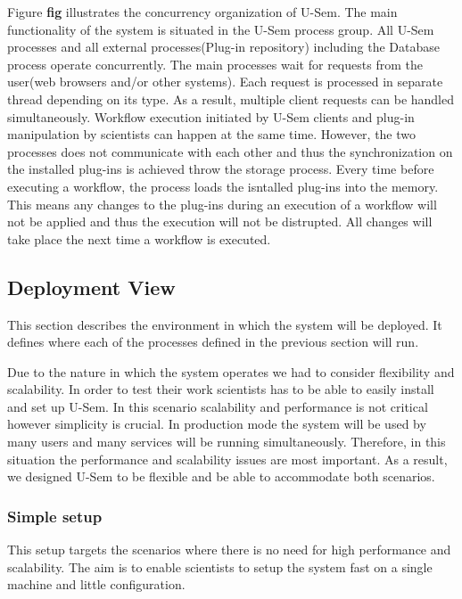 Figure \textbf{fig} illustrates the concurrency organization of U-Sem. The main functionality of the system is situated in the U-Sem process group. All U-Sem processes and all external processes(Plug-in repository) including the Database process operate concurrently. The main processes wait for requests from the user(web browsers and/or other systems). Each request is processed in separate thread depending on its type. As a result, multiple client requests can be handled simultaneously. Workflow execution initiated by U-Sem clients and plug-in manipulation by scientists can happen at the same time. However, the two processes does not communicate with each other and thus the synchronization on the installed plug-ins is achieved throw the storage process. Every time before executing a workflow, the process loads the isntalled plug-ins into the memory. This means any changes to the plug-ins during an execution of a workflow will not be applied and thus the execution will not be distrupted. All changes will take place the next time a workflow is executed.

\subsection{Deployment View}

This section describes the environment in which the system will be deployed. It defines where each of the processes defined in the previous section will run. 

Due to the nature in which the system operates we had to consider flexibility and scalability. In order to test their work scientists has to be able to easily install and set up U-Sem. In this scenario scalability and performance is not critical however simplicity is crucial. In production mode the system will be used by many users and many services will be running simultaneously. Therefore, in this situation the performance and scalability issues are most important. As a result, we designed U-Sem to be flexible and be able to accommodate both scenarios.



\subsubsection{Simple setup}

This setup targets the scenarios where there is no need for high performance and scalability. The aim is to enable scientists to  setup the system fast on a single machine and little configuration. 


